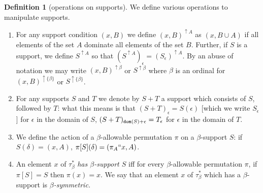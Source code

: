 \documentclass[112pt]{article}
\theoremstyle{definition}
\newtheorem{definition}[theorem]{Definition}
\theoremstyle{remark}
\begin{document}
\begin{definition}[operations on supports]\label{def:support_operations}
{We define various operations to manipulate supports.}
\begin{enumerate}
\item For any support condition $(x,B)$ we define $(x,B)^{\uparrow A}$ as $(x,B\cup A)$ if all elements of the set $A$ dominate all elements of the set $B$.
Further, if $S$ is a support, we define $S^{\uparrow A}$ so that $(S^{\uparrow A})_\epsilon = (S_\epsilon)^{\uparrow A}$.  By an abuse of notation we may write $(x,B)^{\uparrow \beta}$ or $S^{\uparrow \beta}$ where $\beta$ is an ordinal for $(x,B)^{\uparrow \{\beta\}}$ or $S^{\uparrow \{\beta\}}$.

\item For any supports $S$ and $T$ we denote by $S+T$ a support which consists
of $S$, followed by $T$:  what this means is that $(S+T)_\epsilon = S(\epsilon)$ [which we write $S_\epsilon$] for $\epsilon$ in the domain of $S$, $(S+T)_{{\tt dom}(S)+\epsilon} = T_\epsilon$ for $\epsilon$ in the domain of $T$.

\item We define the action of a $\beta$-allowable permutation $\pi$ on a $\beta$-support $S$:  if $S(\delta) = (x,A)$, $\pi[S](\delta) = (\pi_A``x,A)$.
\item
An element $x$ of $\tau^*_\beta$ {\em has $\beta$-support $S$\/} iff for every $\beta$-allowable permutation $\pi$, if $\pi[S] = S$ then $\pi(x)=x$.  We say that  an element $x$ of $\tau^*_\beta$ which has a $\beta$-support is {\em $\beta$-symmetric.}
\end{enumerate}
\end{definition}
\end{document}

